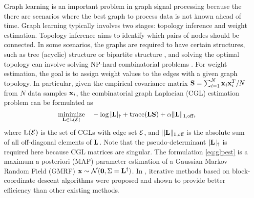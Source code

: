 \documentclass{article}
\begin{document}
Graph learning \cite{Dong2016,Egilmez2017} is an important problem in graph signal processing because the there are scenarios where the best graph to process data is not known ahead of time. Graph learning typically involves two stages: topology inference and weight estimation. Topology inference aims to identify which pairs of nodes should be connected. In some scenarios, the graphs are required to have certain structures, such as tree (acyclic) structure \cite{Shen2009} or bipartite structure \cite{Narang2012}, and solving the optimal topology can involve solving NP-hard combinatorial problems \cite{Pavez2017}. For weight estimation, the goal is to assign weight values to the edges with a given graph topology. In particular, given the empirical covariance matrix ${\bf S}=\sum_{i=1}^N {\bf x}_i{\bf x}_i^T/N$ from $N$ data samples ${\bf x}_i$, the combinatorial graph Laplacian (CGL) estimation problem can be formulated as 
\begin{equation}
\label{eq:glpest}
  \underset{{\bf L}\in\mathbb{L}({\cal E})}{\text{minimize}} \quad -\log|{\bf L}|_\dagger
    +\text{trace}({\bf L}{\bf S})+\alpha\|{\bf L}\|_{\text{1,off}},
\end{equation}
where $\mathbb{L}({\cal E})$ is the set of CGLs with edge set ${\cal E}$, and $\|{\bf L}\|_{\text{1,off}}$ is the absolute sum of all off-diagonal elements of ${\bf L}$. Note that the pseudo-determinant $|{\bf L}|_\dagger$ is required here because CGL matrices are singular. The formulation \eqref{eq:glpest} is a maximum a posteriori (MAP) parameter estimation of a Gaussian Markov Random Field (GMRF) ${\bf x}\sim{\cal N}({\bf 0},\Sigma={\bf L}^\dagger)$. In \cite{Egilmez2017}, iterative methods based on block-coordinate descent algorithms were proposed and shown to provide better efficiency than other existing methods. 
\end{document}
